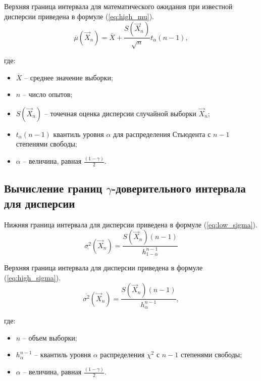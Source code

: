 Верхняя граница интервала для математического ожидания при известной дисперсии приведена в формуле (\ref{eq:high_mu}).
\begin{equation}
	\label{eq:high_mu}
	\overline{\mu}(\vec{X}_{n}) = \overline{X}+\frac{S(\vec{X}_{n})}{\sqrt{n}}t_{\alpha}(n-1),
\end{equation}

\noindent где:
\begin{itemize}
	\item $\overline{X}$ -- среднее значение выборки;
	\item $n$ -- число опытов;
	\item $S(\vec{X}_{n})$ -- точечная оценка дисперсии случайной выборки $\vec{X}_{n}$;
	\item $t_{\alpha}(n-1)$ квантиль уровня $\alpha$ для распределения Стьюдента с $n-1$ степенями свободы;
	\item $\alpha$ -- величина, равная $\displaystyle\frac{(1-\gamma)}{2}$.
\end{itemize}

\subsection{Вычисление границ $\gamma$-доверительного интервала для дисперсии}
\vspace{-0.7cm}
Нижняя граница интервала для дисперсии приведена в формуле (\ref{eq:low_sigma}).
\begin{equation}
	\label{eq:low_sigma}
	\underline{\sigma^{2}}(\vec{X}_{n})  =\frac{S(\vec{X}_{n})(n-1)}{h_{1-\alpha}^{n-1}}
\end{equation}

Верхняя граница интервала для дисперсии приведена в формуле (\ref{eq:high_sigma}).
\begin{equation}
	\label{eq:high_sigma}
	\overline{\sigma^{2}}(\vec{X}_{n})  =\frac{S(\vec{X}_{n})(n-1)}{h_{\alpha}^{n-1}},
\end{equation}

\noindent где:
\begin{itemize}
	\item $n$ -- объем выборки;
	\item $h_{\alpha}^{n-1}$ -- квантиль уровня $\alpha$ распределения $\chi^{2}$ с $n-1$ степенями свободы;
	\item $\alpha$ -- величина, равная $\displaystyle\frac{(1-\gamma)}{2}$.
\end{itemize}